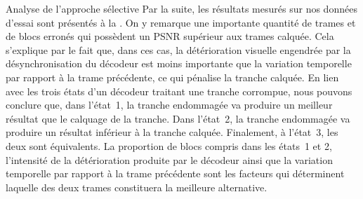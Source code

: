 \begin{section}{Analyse de l'approche sélective}
Par la suite, les résultats mesurés sur nos données d'essai sont présentés à la
. On y remarque une importante quantité de trames et de
blocs erronés qui possèdent un PSNR supérieur aux trames calquée. Cela
s'explique par le fait que, dans ces cas, la détérioration visuelle engendrée
par la désynchronisation du décodeur est moins importante que la variation
temporelle par rapport à la trame précédente, ce qui pénalise la tranche
calquée. En lien avec les trois états d'un décodeur traitant une tranche
corrompue, nous pouvons conclure que, dans l'état~1, la tranche endommagée va
produire un meilleur résultat que le calquage de la tranche. Dans l'état~2, la
tranche endommagée va produire un résultat inférieur à la tranche calquée.
Finalement, à l'état~3, les deux sont équivalents. La proportion de blocs
compris dans les états~1 et 2, l'intensité de la détérioration produite par le
décodeur ainsi que la variation temporelle par rapport à la trame précédente
sont les facteurs qui déterminent laquelle des deux trames constituera la
meilleure alternative.


\end{section}
